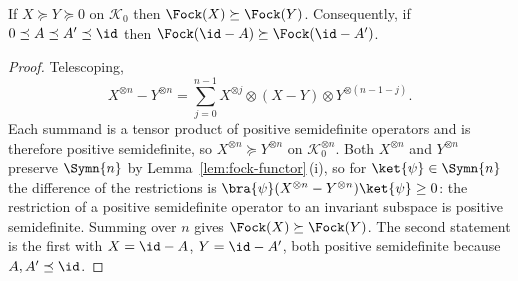 
\begin{lemma}\label{lem:fock-monotone}
If $X\succeq Y\succeq0$ on $\mathcal{K}_0$ then $\Fock(X)\succeq\Fock(Y)$.
Consequently, if $0\preceq A\preceq A'\preceq\id$ then
$\Fock(\id-A)\succeq\Fock(\id-A')$.
\end{lemma}

\begin{proof}
Telescoping,
\begin{equation}\label{eq:telescope}
  X^{\otimes n}-Y^{\otimes n}
  =\sum_{j=0}^{n-1}X^{\otimes j}\otimes(X-Y)\otimes Y^{\otimes(n-1-j)} .
\end{equation}
Each summand is a tensor product of positive semidefinite operators and is
therefore positive semidefinite, so $X^{\otimes n}\succeq Y^{\otimes n}$ on
$\mathcal{K}_0^{\otimes n}$. Both $X^{\otimes n}$ and $Y^{\otimes n}$ preserve
$\Symn{n}$ by Lemma~\ref{lem:fock-functor}\,(i), so for
$\ket{\psi}\in\Symn{n}$ the difference of the restrictions is
$\bra{\psi}(X^{\otimes n}-Y^{\otimes n})\ket{\psi}\ge0$: the restriction of a
positive semidefinite operator to an invariant subspace is positive
semidefinite. Summing over $n$ gives $\Fock(X)\succeq\Fock(Y)$. The second
statement is the first with $X=\id-A$, $Y=\id-A'$, both positive semidefinite
because $A,A'\preceq\id$.
\end{proof}
